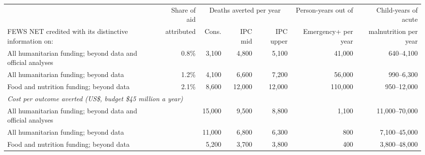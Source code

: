 \begin{tabular}{lrrrrrr}
\toprule
 & Share of aid & \multicolumn{3}{c}{Deaths averted per year} & Person-years out of & Child-years of acute \\
\cmidrule(lr){3-5}
FEWS NET credited with its distinctive information on: & attributed & Cons. & IPC mid & IPC upper & Emergency+ per year & malnutrition per year \\
\midrule
All humanitarian funding; beyond data and official analyses & 0.8\% & 3,100 & 4,800 & 5,100 & 41,000 & 640--4,100 \\
All humanitarian funding; beyond data & 1.2\% & 4,100 & 6,600 & 7,200 & 56,000 & 990--6,300 \\
Food and nutrition funding; beyond data & 2.1\% & 8,600 & 12,000 & 12,000 & 110,000 & 950--12,000 \\
\midrule
\multicolumn{7}{l}{\textit{Cost per outcome averted (US\$, budget \$45 million a year)}} \\
\quad All humanitarian funding; beyond data and official analyses & & 15,000 & 9,500 & 8,800 & 1,100 & 11,000--70,000 \\
\quad All humanitarian funding; beyond data & & 11,000 & 6,800 & 6,300 & 800 & 7,100--45,000 \\
\quad Food and nutrition funding; beyond data & & 5,200 & 3,700 & 3,800 & 400 & 3,800--48,000 \\
\bottomrule
\end{tabular}